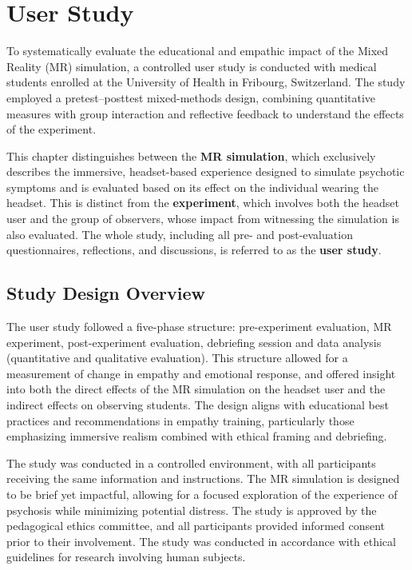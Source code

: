 \chapter{User Study}
\label{ch:userstudy}


To systematically evaluate the educational and empathic impact of the Mixed Reality (MR) simulation, a controlled user study is conducted with medical students enrolled at the University of Health in Fribourg, Switzerland. The study employed a pretest–posttest mixed-methods design, combining quantitative measures with group interaction and reflective feedback to understand the effects of the experiment.

\vspace{1em}

This chapter distinguishes between the \textbf{MR simulation}, which exclusively describes the immersive, headset-based experience designed to simulate psychotic symptoms and is evaluated based on its effect on the individual wearing the headset. This is distinct from the \textbf{experiment}, which involves both the headset user  and the group of observers, whose impact from witnessing the simulation is also evaluated. The whole study, including all pre- and post-evaluation questionnaires, reflections, and discussions, is referred to as the \textbf{user study}.

\section{Study Design Overview}

The user study followed a five-phase structure: pre-experiment evaluation, MR experiment, post-experiment evaluation, debriefing session and data analysis (quantitative and qualitative evaluation). This structure allowed for a measurement of change in empathy and emotional response, and offered insight into both the direct effects of the MR simulation on the headset user and the indirect effects on observing students. The design aligns with educational best practices and recommendations in empathy training, particularly those emphasizing immersive realism combined with ethical framing and debriefing.


\vspace{1em}
The study was conducted in a controlled environment, with all participants receiving the same information and instructions. The MR simulation is designed to be brief yet impactful, allowing for a focused exploration of the experience of psychosis while minimizing potential distress.
The study is approved by the pedagogical ethics committee, and all participants provided informed consent prior to their involvement. The study was conducted in accordance with ethical guidelines for research involving human subjects.

